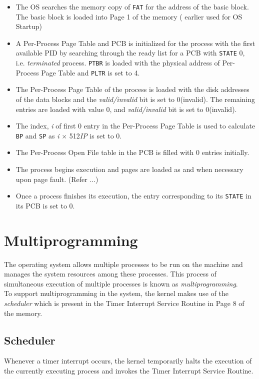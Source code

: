 \documentclass[11pt]{report}
\begin{document}
\begin{itemize}
	\item The OS searches the memory copy of \texttt{FAT} for the address of the basic block. The basic block is loaded into Page 1 of the memory ( earlier used for OS Startup)
	\item A Per-Process Page Table and  PCB is initialized for the process with the first available PID by searching through the ready list for a PCB with \texttt{STATE} 0, i.e. \textit{terminated} process. \texttt{PTBR} is loaded with the physical address of Per-Process Page Table and \texttt{PLTR} is set to 4.
	\item The Per-Process Page Table of the process is loaded with the disk addresses of the data blocks and the \textit{valid/invalid} bit is set to 0(invalid). The remaining entries are loaded with value 0, and \textit{valid/invalid} bit is set to 0(invalid). 
	\item The index, \textit{i} of first 0 entry in the Per-Process Page Table is used to calculate \texttt{BP} and \texttt{SP} as \textit{i} $\times$ 512\textit{IP} is set to 0. 
	\item The Per-Process Open File table in the PCB is filled with 0 entries initially.
	\item The process begins execution and pages are loaded as and when necessary upon page fault. (Refer ...)
	\item Once a process finishes its execution, the entry corresponding to its \texttt{STATE} in its PCB is set to 0.

\end{itemize}

\section{Multiprogramming}
	
The operating system allows multiple processes to be run on the machine and manages the system resources among these processes. This process of simultaneous execution of multiple processes is known as \emph{multiprogramming}.  \\

To support multiprogramming in the system, the kernel makes use of the \emph{scheduler} which is present in the Timer Interrupt Service Routine in Page 8 of the memory.

\subsection{Scheduler}
\label{chp:scheduler}
Whenever a timer interrupt occurs, the kernel temporarily halts the execution of the currently executing process and invokes the Timer Interrupt Service Routine.
\end{document}
